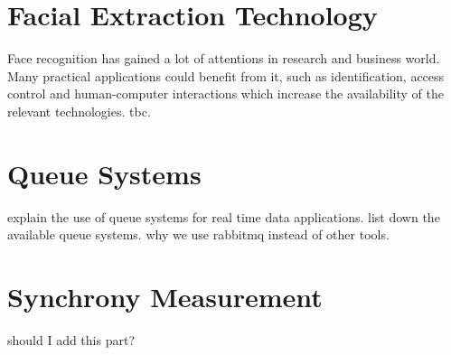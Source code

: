 \section{Facial Extraction Technology}
Face recognition has gained a lot of attentions in research and business world. Many practical applications could benefit from it, 
such as identification, access control and human-computer interactions which increase the availability of the relevant technologies.
tbc.

\section{Queue Systems}
explain the use of queue systems for real time data applications. list down the available queue systems. why we use rabbitmq instead of other tools.

\section{Synchrony Measurement}
should I add this part?